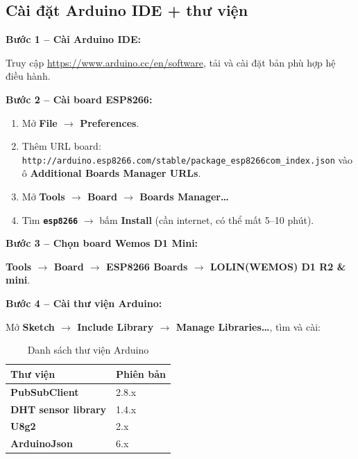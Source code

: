 \documentclass[13pt,a4paper]{article}
\newcommand{\code}[1]{\texttt{#1}}
\begin{document}
\subsection{Cài đặt Arduino IDE + thư viện}
\label{sec:arduino}

\textbf{Bước 1 -- Cài Arduino IDE:}

Truy cập \url{https://www.arduino.cc/en/software}, tải và cài đặt bản phù hợp hệ điều hành.

\textbf{Bước 2 -- Cài board ESP8266:}

\begin{enumerate}[label=\arabic*., leftmargin=1.5cm]
    \item Mở \textbf{File $\rightarrow$ Preferences}.
    \item Thêm URL board: \code{http://arduino.esp8266.com/stable/package\_esp8266com\_index.json} vào ô \textbf{Additional Boards Manager URLs}.
    \item Mở \textbf{Tools $\rightarrow$ Board $\rightarrow$ Boards Manager\ldots}
    \item Tìm \textbf{\code{esp8266}} $\rightarrow$ bấm \textbf{Install} (cần internet, có thể mất 5--10 phút).
\end{enumerate}

\textbf{Bước 3 -- Chọn board Wemos D1 Mini:}

\textbf{Tools $\rightarrow$ Board $\rightarrow$ ESP8266 Boards $\rightarrow$ LOLIN(WEMOS) D1 R2 \& mini}.

\textbf{Bước 4 -- Cài thư viện Arduino:}

Mở \textbf{Sketch $\rightarrow$ Include Library $\rightarrow$ Manage Libraries\ldots}, tìm và cài:

\begin{table}[htbp]
    \centering
    \caption{Danh sách thư viện Arduino}
    \label{tbl:libs}
    \begin{tabular}{|L{5cm}|C{4cm}|}
        \hline
        \textbf{Thư viện} & \textbf{Phiên bản} \\
        \hline
        \textbf{PubSubClient} & 2.8.x \\
        \hline
        \textbf{DHT sensor library} & 1.4.x \\
        \hline
        \textbf{U8g2} & 2.x \\
        \hline
        \textbf{ArduinoJson} & 6.x \\
        \hline
    \end{tabular}
\end{table}
\end{document}
